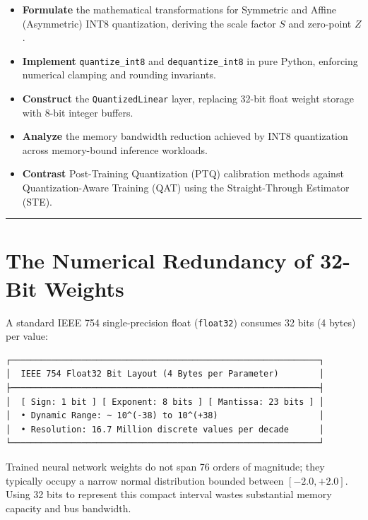 \documentclass[
  letterpaper,
]{scrbook}
\providecommand{\tightlist}{%
  \setlength{\itemsep}{0pt}\setlength{\parskip}{0pt}}
\begin{document}
\begin{itemize}
\tightlist
\item
  \textbf{Formulate} the mathematical transformations for Symmetric and
  Affine (Asymmetric) INT8 quantization, deriving the scale factor \(S\)
  and zero-point \(Z\).
\item
  \textbf{Implement} \texttt{quantize\_int8} and
  \texttt{dequantize\_int8} in pure Python, enforcing numerical clamping
  and rounding invariants.
\item
  \textbf{Construct} the \texttt{QuantizedLinear} layer, replacing
  32-bit float weight storage with 8-bit integer buffers.
\item
  \textbf{Analyze} the memory bandwidth reduction achieved by INT8
  quantization across memory-bound inference workloads.
\item
  \textbf{Contrast} Post-Training Quantization (PTQ) calibration methods
  against Quantization-Aware Training (QAT) using the Straight-Through
  Estimator (STE).
\end{itemize}

\begin{center}\rule{0.5\linewidth}{0.5pt}\end{center}

\section{The Numerical Redundancy of 32-Bit
Weights}\label{the-numerical-redundancy-of-32-bit-weights}

A standard IEEE 754 single-precision float (\texttt{float32}) consumes
32 bits (4 bytes) per value:

\begin{verbatim}
┌─────────────────────────────────────────────────────────────┐
│  IEEE 754 Float32 Bit Layout (4 Bytes per Parameter)        │
├─────────────────────────────────────────────────────────────┤
│  [ Sign: 1 bit ] [ Exponent: 8 bits ] [ Mantissa: 23 bits ] │
│  • Dynamic Range: ~ 10^(-38) to 10^(+38)                    │
│  • Resolution: 16.7 Million discrete values per decade      │
└─────────────────────────────────────────────────────────────┘
\end{verbatim}

Trained neural network weights do not span 76 orders of magnitude; they
typically occupy a narrow normal distribution bounded between
\([-2.0, +2.0]\). Using 32 bits to represent this compact interval
wastes substantial memory capacity and bus bandwidth.
\end{document}

